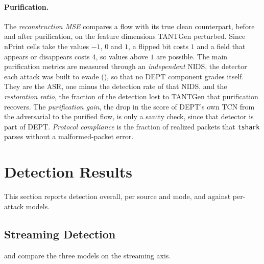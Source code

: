 \paragraph{Purification.} The \emph{reconstruction \ac{MSE}} compares a flow with its
true clean counterpart, before and after purification, on the feature dimensions
TANTGen perturbed. Since nPrint cells take the values $-1$, $0$ and $1$, a flipped bit
costs $1$ and a field that appears or disappears costs $4$, so values above $1$ are
possible. The main purification metrics are measured through an \emph{independent}
\ac{NIDS}, the detector each attack was built to evade (),
so that no DEPT component grades itself. They are the \ac{ASR}, one minus the detection
rate of that \ac{NIDS}, and the \emph{restoration ratio}, the fraction of the detection
lost to TANTGen that purification recovers. The \emph{purification gain}, the drop in
the score of DEPT's own \ac{TCN} from the adversarial to the purified flow, is only a
sanity check, since that detector is part of DEPT. \emph{Protocol compliance}
is the fraction of realized packets that \texttt{tshark} parses without a
malformed-packet error.

\section{Detection Results}\label{sec:eval-base}

This section reports detection overall, per source and mode, and against per-attack models.

\subsection{Streaming Detection}\label{sec:eval-meta}

 and  compare the three models on the
streaming axis.

